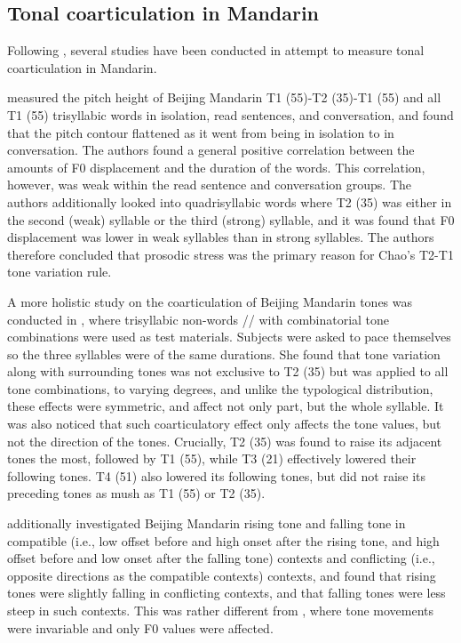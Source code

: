 \documentclass[12pt]{report}
\newcommand{\tip}{\textipa}
\begin{document}
\begin{CJK}{UTF8}{bsmi}
\section{Tonal coarticulation in Mandarin}
Following \cite{Chao1968}, several studies have been conducted in attempt to measure tonal coarticulation in Mandarin.

\cite{ShihSproat1992} measured the pitch height of Beijing Mandarin T1 (55)-T2 (35)-T1 (55) and all T1 (55) trisyllabic words in isolation, read sentences, and conversation, and found that the pitch contour flattened as it went from being in isolation to in conversation. The authors found a general positive correlation between the amounts of F0 displacement and the duration of the words. This correlation, however, was weak within the read sentence and conversation groups. The authors additionally looked into quadrisyllabic words where T2 (35) was either in the second (weak) syllable or the third (strong) syllable, and it was found that F0 displacement was lower in weak syllables than in strong syllables. The authors therefore concluded that prosodic stress was the primary reason for Chao's T2-T1 tone variation rule.

A more holistic study on the coarticulation of Beijing Mandarin tones was conducted in \cite{Shen1990}, where trisyllabic non-words /\tip{pa.pa.pa}/ with combinatorial tone combinations were used as test materials. Subjects were asked to pace themselves so the three syllables were of the same durations.  She found that tone variation along with surrounding tones was not exclusive to T2 (35) but was applied to all tone combinations, to varying degrees, and unlike the typological distribution, these effects were symmetric, and affect not only part, but the whole syllable. It was also noticed that such coarticulatory effect only affects the tone values, but not the direction of the tones. Crucially, T2 (35) was found to raise its adjacent tones the most, followed by T1 (55), while T3 (21) effectively lowered their following tones. T4 (51) also lowered its following tones, but did not raise its preceding tones as mush as T1 (55) or T2 (35).

\cite{Xu1994} additionally investigated Beijing Mandarin rising tone and falling tone in compatible (i.e., low offset before and high onset after the rising tone, and high offset before and low onset after the falling tone) contexts and conflicting (i.e., opposite directions as the compatible contexts) contexts, and found that rising tones were slightly falling in conflicting contexts, and that falling tones were less steep in such contexts. This was rather different from \cite{Shen1990}, where tone movements were invariable and only F0 values were affected.


\end{CJK}
\end{document}
